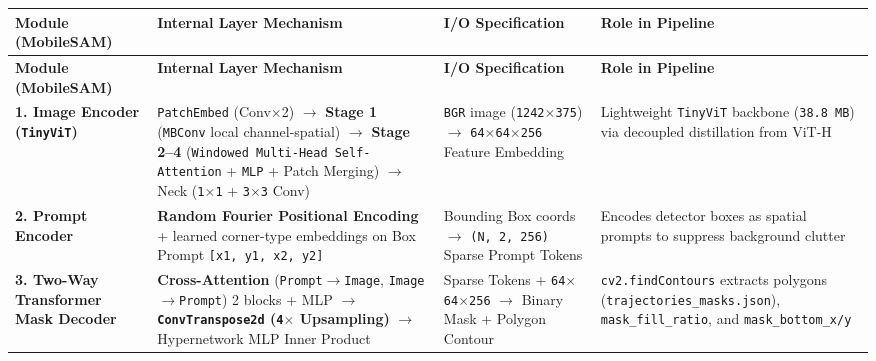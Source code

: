 \documentclass[10.5pt,a4paper]{article}
\begin{document}
\begin{footnotesize}
\setlength{\tabcolsep}{4pt}
\setlength{\LTleft}{0pt}\setlength{\LTright}{0pt}
\begin{longtable}{>{\raggedright\arraybackslash}p{} >{\raggedright\arraybackslash}p{} >{\raggedright\arraybackslash}p{} >{\raggedright\arraybackslash}p{}}
\toprule
\textbf{Module (MobileSAM)} & \textbf{Internal Layer Mechanism} & \textbf{I/O Specification} & \textbf{Role in Pipeline} \\
\midrule
\endfirsthead
\toprule
\textbf{Module (MobileSAM)} & \textbf{Internal Layer Mechanism} & \textbf{I/O Specification} & \textbf{Role in Pipeline} \\
\midrule
\endhead
\bottomrule
\endfoot
\textbf{1. Image Encoder (\texttt{TinyViT})} & \texttt{PatchEmbed} (Conv$\times$2) $\rightarrow$ \textbf{Stage 1} (\texttt{MBConv} local channel-spatial) $\rightarrow$ \textbf{Stage 2--4} (\texttt{Windowed Multi-\allowbreak{}Head Self-\allowbreak{}Attention} + \texttt{MLP} + Patch Merging) $\rightarrow$ Neck (\texttt{1$\times$1} + \texttt{3$\times$3} Conv) & \texttt{BGR} image (\texttt{1242$\times$375}) $\rightarrow$ \texttt{64$\times$64$\times$256} Feature Embedding & Lightweight \texttt{TinyViT} backbone (\texttt{38.\allowbreak{}8 MB}) via decoupled distillation from ViT-H \\
\textbf{2. Prompt Encoder} & \textbf{Random Fourier Positional Encoding} + learned corner-type embeddings on Box Prompt \texttt{[x1,\allowbreak{} y1,\allowbreak{} x2,\allowbreak{} y2]} & Bounding Box coords $\rightarrow$ \texttt{(N,\allowbreak{} 2,\allowbreak{} 256)} Sparse Prompt Tokens & Encodes detector boxes as spatial prompts to suppress background clutter \\
\textbf{3. Two-Way Transformer Mask Decoder} & \textbf{Cross-Attention} (\texttt{Prompt$\rightarrow$Image}, \texttt{Image$\rightarrow$Prompt}) 2 blocks + MLP $\rightarrow$ \textbf{\texttt{ConvTranspose2d} (\texttt{4$\times$} Upsampling)} $\rightarrow$ Hypernetwork MLP Inner Product & Sparse Tokens + \texttt{64$\times$64$\times$256} $\rightarrow$ Binary Mask + Polygon Contour & \texttt{cv2.\allowbreak{}findContours} extracts polygons (\texttt{trajectories\_\allowbreak{}masks.\allowbreak{}json}), \texttt{mask\_\allowbreak{}fill\_\allowbreak{}ratio}, and \texttt{mask\_\allowbreak{}bottom\_\allowbreak{}x/\allowbreak{}y} \\
\end{longtable}
\end{footnotesize}
\end{document}

